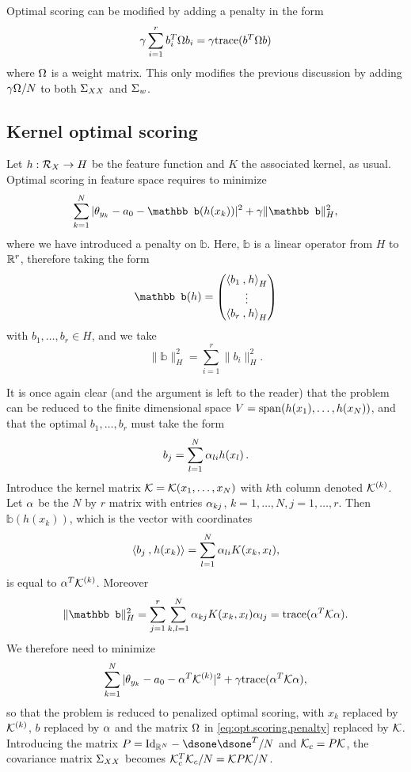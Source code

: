 \begin{remark}
Optimal scoring can be modified  by adding a penalty in the form 
\begin{equation}
\label{eq:opt.scoring.penalty}
\gamma \sum_{i=1}^r b_i^T\Omega b_i = \gamma {\mathrm{trace}}(b^T\Omega b)
\end{equation}
where $\Omega$ is a weight matrix. This
only modifies the previous discussion by adding $\gamma\Omega/N$ to both
$\Sigma_{XX}$ and $\Sigma_w$.
\end{remark}

\subsection{Kernel optimal scoring}
Let $h:{\mathcal R}_X\to H$ be the feature function and $K$ the associated kernel, as usual.
Optimal scoring in feature space requires to minimize 
$$
\sum_{k=1}^N |\th_{y_k} - {a_0} - \mathbb b(h(x_k))|^2 + \ga \|\mathbb b\|_H^2,
$$
where we have introduced a penalty on $\mathbb b$.
Here, $\mathbb b$ is a linear operator from $H$ to ${\mathbb{R}}^r$, therefore taking the form
\[
\mathbb b(h) = \begin{pmatrix} \scp{b_1}{h}_H \\ \vdots\\\scp{b_r}{h}_H
\end{pmatrix}
\]
with $b_1, \ldots, b_r \in H$, and we take
\[
 \|\mathbb b\|_H^2 = \sum_{i=1}^r \|b_i\|_H^2.
 \]
 
It is once again clear (and the argument is left to the reader) that the problem can be reduced to the finite dimensional space $V = \mathrm{span}(h(x_1), \ldots, h(x_N))$, and that the optimal $b_1, \ldots, b_r$ must take the form
\[
b_j = \sum_{l=1}^N \alpha_{li} h(x_l)\,.
\]
Introduce the kernel matrix ${\mathcal K} = {\mathcal K}(x_1, \ldots, x_N)$ with $k$th column denoted ${\mathcal K}^{(k)}$. Let $\alpha$ be the $N$ by $r$ matrix with entries $\alpha_{kj}$, $k=1, \ldots, N, j=1, \ldots, r$. Then $\mathbb b(h(x_k))$, which is the vector with coordinates
\[
{\langle {b_j}\mathbin{,} {h(x_k)}\rangle} = \sum_{l=1}^N \alpha_{li} K(x_k, x_l),
\]
is equal to  $\alpha^T {\mathcal K}^{(k)}$. Moreover 
\[
\|\mathbb b\|_H^2 = \sum_{j=1}^r \sum_{k,l=1}^N \al_{kj} K(x_k, x_l) \al_{lj} = \trace(\al^T \CK\al).
\]
We therefore need to minimize 
\[
\sum_{k=1}^N |\theta_{y_k} - {a_0} - \alpha^T {\mathcal K}^{(k)}|^2 + \gamma {\mathrm{trace}}(\alpha^T {\mathcal K}\alpha),
\]
so that the problem is reduced to penalized optimal scoring, with $x_k$ replaced by ${\mathcal K}^{(k)}$, $b$ replaced by $\alpha$ and the matrix $\Omega$ in \cref{eq:opt.scoring.penalty} replaced by ${\mathcal K}$. Introducing the matrix $P = \Id[N] - \dsone\dsone^T/N$ and
${\mathcal K}_c = P{\mathcal K}$, the covariance matrix $\Sigma_{XX}$ becomes ${\mathcal K}_c^T{\mathcal K}_c/N = {\mathcal K} P {\mathcal K}/N$.

